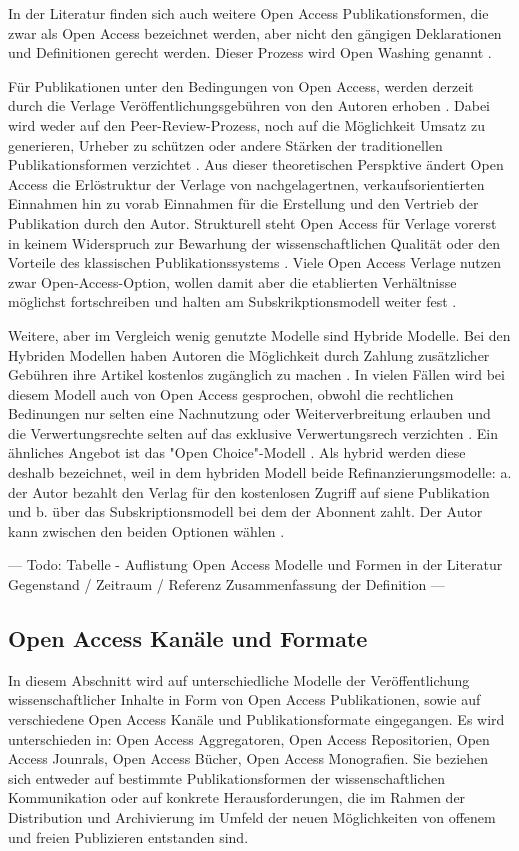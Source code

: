 In der Literatur \cite{suchen} finden sich auch weitere Open Access Publikationsformen, die zwar als Open Access bezeichnet werden, aber nicht den gängigen Deklarationen \cite{boai_2012} und Definitionen gerecht werden. Dieser Prozess wird Open Washing genannt \cite{suchen}.

Für Publikationen unter den Bedingungen von Open Access, werden derzeit durch die Verlage Veröffentlichungsgebühren von den Autoren erhoben \cite{suchen}. Dabei wird weder auf den Peer-Review-Prozess, noch auf die Möglichkeit Umsatz zu generieren, Urheber zu schützen oder andere Stärken der traditionellen Publikationsformen verzichtet \cite{albert_2006_open_implications} \cite{Open_Access_net_2009}. Aus dieser theoretischen Perspktive ändert Open Access die Erlöstruktur der Verlage von nachgelagertnen, verkaufsorientierten Einnahmen hin zu vorab Einnahmen für die Erstellung und den Vertrieb der Publikation durch den Autor. Strukturell steht Open Access für Verlage vorerst in keinem Widerspruch zur Bewarhung der wissenschaftlichen Qualität oder den Vorteile des klassischen Publikationssystems \cite{Suber_2002}. Viele Open Access Verlage nutzen zwar Open-Access-Option, wollen damit aber die etablierten Verhältnisse möglichst fortschreiben und halten am Subskrikptionsmodell weiter fest \cite{schmidt_2007_goldenen}.

Weitere, aber im Vergleich wenig genutzte Modelle sind Hybride Modelle. Bei den Hybriden Modellen haben Autoren die Möglichkeit durch Zahlung zusätzlicher Gebühren ihre Artikel kostenlos zugänglich zu machen \cite{muller_2010_open}. In vielen Fällen wird bei diesem Modell auch von Open Access gesprochen, obwohl die rechtlichen Bedinungen nur selten eine Nachnutzung oder Weiterverbreitung erlauben und die Verwertungsrechte selten auf das exklusive Verwertungsrech verzichten \cite{muller_2010_open}. Ein ähnliches Angebot ist das "Open Choice"-Modell \cite{Hess_2006}. Als hybrid werden diese deshalb bezeichnet, weil in dem hybriden Modell beide Refinanzierungsmodelle: a. der Autor bezahlt den Verlag für den kostenlosen Zugriff auf siene Publikation und b. über das Subskriptionsmodell bei dem der Abonnent zahlt. Der Autor kann zwischen den beiden Optionen wählen \cite{muller_2010_open}.

--- Todo: Tabelle - Auflistung Open Access  Modelle und Formen in der Literatur
Gegenstand / Zeitraum / Referenz
Zusammenfassung der Definition ---

\subsection{Open Access Kanäle und Formate}
In diesem Abschnitt wird auf unterschiedliche Modelle der Veröffentlichung wissenschaftlicher Inhalte in Form von Open Access Publikationen, sowie auf verschiedene Open Access Kanäle und Publikationsformate eingegangen. Es wird unterschieden in: Open Access Aggregatoren, Open Access Repositorien, Open Access Jounrals, Open Access Bücher, Open Access Monografien. Sie beziehen sich entweder auf bestimmte Publikationsformen der wissenschaftlichen Kommunikation oder auf konkrete Herausforderungen, die im Rahmen der Distribution und Archivierung im Umfeld der neuen Möglichkeiten von offenem und freien Publizieren entstanden sind.

